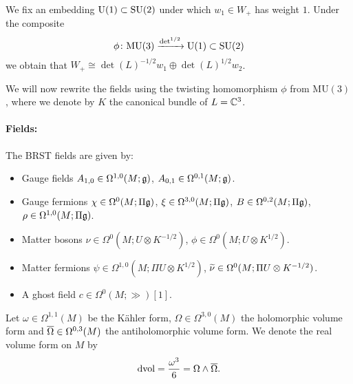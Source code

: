 \documentclass[10pt, oneside]{article}
\newcommand{\MU}{\mathrm{MU}}
\renewcommand{\U}{\mathrm{U}}
\begin{document}
We fix an embedding $\U(1)\subset \SU(2)$ under which $w_1\in W_+$ has weight $1$. Under the composite
\[\phi\colon\MU(3)\xrightarrow{\det^{1/2}}\U(1)\subset \SU(2)\]
we obtain that $W_+\cong \det(L)^{-1/2} w_1\oplus \det(L)^{1/2} w_2$.

We will now rewrite the fields using the twisting homomorphism $\phi$ from $\MU(3)$, where we denote by $K$ the canonical bundle of $L=\mathbb C^3$.

\vspace{-10pt}
\paragraph{Fields:} The BRST fields are given by:
\begin{itemize}
\item Gauge fields $A_{1, 0} \in \Omega^{1, 0}(M; \mathfrak g)$, $A_{0, 1}\in\Omega^{0, 1}(M; \mathfrak g)$.
\item Gauge fermions $\chi\in\Omega^0(M; \Pi\mathfrak g)$, $\xi\in\Omega^{3, 0}(M; \Pi\mathfrak g)$, $B\in\Omega^{0, 2}(M; \Pi\mathfrak g)$, $\rho\in\Omega^{1, 0}(M; \Pi\mathfrak g)$.
\item Matter bosons $\nu\in\Omega^0(M; U\otimes K^{-1/2})$, $\phi\in\Omega^0(M; U\otimes K^{1/2})$.
\item Matter fermions $\psi\in \Omega^{1, 0}(M; \Pi U\otimes K^{1/2})$, $\widetilde{\nu}\in\Omega^0(M; \Pi U\otimes K^{-1/2})$.
\item A ghost field $c\in \Omega^0(M; \gg)[1]$.
\end{itemize}

Let $\omega\in\Omega^{1, 1}(M)$ be the K\"ahler form, $\Omega\in\Omega^{3, 0}(M)$ the holomorphic volume form and $\overline{\Omega}\in\Omega^{0, 3}(M)$ the antiholomorphic volume form.  We denote the real volume form on $M$ by
\[\operatorname{dvol} = \frac{\omega^3}{6} = \Omega\wedge \overline{\Omega}.\]
\end{document}
